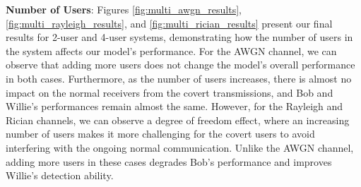 \textbf{Number of Users}: Figures \ref{fig:multi_awgn_results}, \ref{fig:multi_rayleigh_results}, and \ref{fig:multi_rician_results} present our final results for 2-user and 4-user systems, demonstrating how the number of users in the system affects our model's performance. For the AWGN channel, we can observe that adding more users does not change the model's overall performance in both cases. Furthermore, as the number of users increases, there is almost no impact on the normal receivers from the covert transmissions, and Bob and Willie's performances remain almost the same. However, for the Rayleigh and Rician channels, we can observe a degree of freedom effect, where an increasing number of users makes it more challenging for the covert users to avoid interfering with the ongoing normal communication. Unlike the AWGN channel, adding more users in these cases degrades Bob's performance and improves Willie's detection ability.
